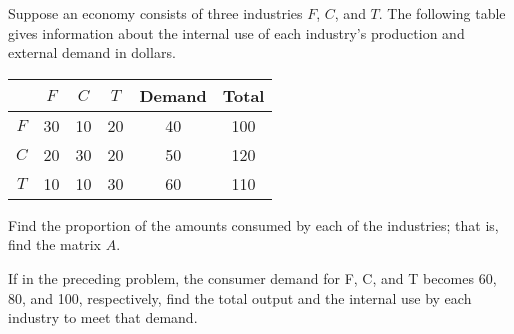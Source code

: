 \begin{puzzle}
    Suppose an economy consists of three industries \( F \), \( C \), and \( T \). The following table gives information about the internal use of each industry’s production and external demand in dollars.

    \begin{center}
        \begin{tabular}{|c|c|c|c|c|c|}
            \hline
                    & \( F \) & \( C \) & \( T \) & Demand & Total \\
            \hline
            \( F \) & 30      & 10      & 20      & 40     & 100   \\
            \( C \) & 20      & 30      & 20      & 50     & 120   \\
            \( T \) & 10      & 10      & 30      & 60     & 110   \\
            \hline
        \end{tabular}
    \end{center}

    Find the proportion of the amounts consumed by each of the industries; that is, find the matrix \( A \).
\end{puzzle}


\begin{puzzle}
    If in the preceding problem, the consumer demand for F, C, and T becomes 60, 80, and 100,
    respectively, find the total output and the internal use by each industry to meet that demand.

\end{puzzle}